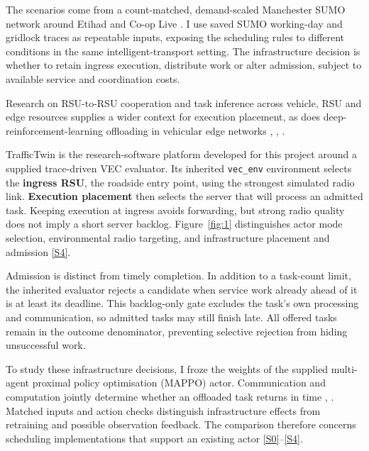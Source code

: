 \documentclass[12pt,a4paper]{article}
\begin{document}
The scenarios come from a count-matched, demand-scaled Manchester SUMO network around Etihad and Co-op Live \cite{ref47}. I use saved SUMO working-day and gridlock traces as repeatable inputs, exposing the scheduling rules to different conditions in the same intelligent-transport setting. The infrastructure decision is whether to retain ingress execution, distribute work or alter admission, subject to available service and coordination costs.

Research on RSU-to-RSU cooperation \cite{ref7} and task inference across vehicle, RSU and edge resources \cite{ref8} supplies a wider context for execution placement, as does deep-reinforcement-learning offloading in vehicular edge networks \cite{ref9}, \cite{ref10}, \cite{ref11}.

TrafficTwin is the research-software platform developed for this project around a supplied trace-driven VEC evaluator. Its inherited \texttt{vec\_env} environment selects the \textbf{ingress RSU}, the roadside entry point, using the strongest simulated radio link. \textbf{Execution placement} then selects the server that will process an admitted task. Keeping execution at ingress avoids forwarding, but strong radio quality does not imply a short server backlog. Figure~\ref{fig:1} distinguishes actor mode selection, environmental radio targeting, and infrastructure placement and admission \hyperref[source-s4]{[S4]}.

Admission is distinct from timely completion. In addition to a task-count limit, the inherited evaluator rejects a candidate when service work already ahead of it is at least its deadline. This backlog-only gate excludes the task's own processing and communication, so admitted tasks may still finish late. All offered tasks remain in the outcome denominator, preventing selective rejection from hiding unsuccessful work.

To study these infrastructure decisions, I froze the weights of the supplied multi-agent proximal policy optimisation (MAPPO) actor. Communication and computation jointly determine whether an offloaded task returns in time \cite{ref3}, \cite{ref6}. Matched inputs and action checks distinguish infrastructure effects from retraining and possible observation feedback. The comparison therefore concerns scheduling implementations that support an existing actor \hyperref[source-s0]{[S0]}--\hyperref[source-s4]{[S4]}.
\end{document}
